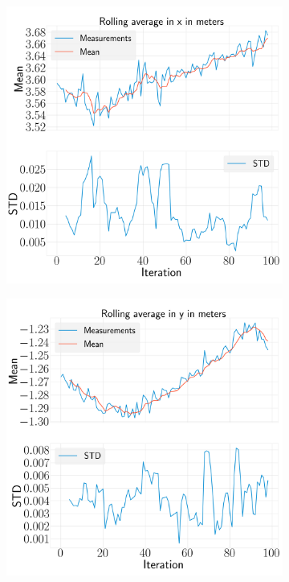 \documentclass[../Head/report.tex]{subfiles}
\begin{document}
\begin{figure}[H]
    \centering
    \begin{subfigure}[t]{.30\textwidth}
        \centering
        \includegraphics[width=\textwidth]{../Figures/analyse_rolling_average/test1/Calculated_rolling_average_in_x_with_mean_and_STD.png}
        \caption{}
        \label{fig:GPS2Vision_pose_estimation_test2_roll}
    \end{subfigure}
     \hspace{0.2em}
    \begin{subfigure}[t]{.30\textwidth}
        \centering
        \includegraphics[width=\textwidth]{../Figures/analyse_rolling_average/test1/Calculated_rolling_average_in_y_with_mean_and_STD.png}

\end{subfigure}
\end{figure}
\end{document}

